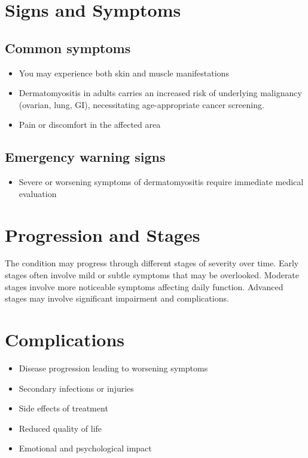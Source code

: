 \section{Signs and Symptoms}

\subsection{Common symptoms}
\begin{itemize}[noitemsep]
  \item You may experience both skin and muscle manifestations
  \item Dermatomyositis in adults carries an increased risk of underlying malignancy (ovarian, lung, GI), necessitating age-appropriate cancer screening.
  \item Pain or discomfort in the affected area
  \end{itemize}

\subsection{Emergency warning signs}
\begin{itemize}[noitemsep]
  \item Severe or worsening symptoms of dermatomyositis require immediate medical evaluation
\end{itemize}
\section{Progression and Stages}
The condition may progress through different stages of severity over time. Early stages often involve mild or subtle symptoms that may be overlooked. Moderate stages involve more noticeable symptoms affecting daily function. Advanced stages may involve significant impairment and complications.
\section{Complications}
\begin{itemize}[noitemsep]
  \item Disease progression leading to worsening symptoms
  \item Secondary infections or injuries
  \item Side effects of treatment
  \item Reduced quality of life
  \item Emotional and psychological impact
\end{itemize}
